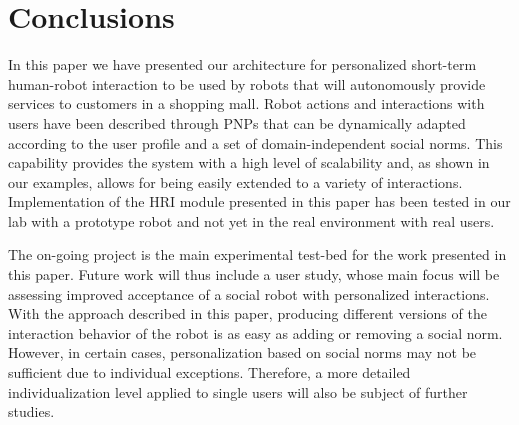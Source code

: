 \vspace{-0.2cm}
\section{Conclusions}
\vspace{-0.1cm}

In this paper we have presented our architecture for personalized short-term human-robot interaction to be used by {\coaches} robots that will autonomously provide services to customers in a shopping mall.
Robot actions and interactions with users have been described through PNPs that can be dynamically adapted according to the user profile and a set of domain-independent social norms. This capability provides the system with a high level of scalability and, as shown in our examples, allows for being easily extended to a variety of interactions.
Implementation of the HRI module presented in this paper has been tested in our lab with a prototype robot and not yet in the real environment with real users.

The on-going {\coaches} project is the main experimental test-bed for the work presented in this paper. Future work  will thus include a user study, whose main focus will be assessing improved acceptance of a social robot with personalized interactions. With the approach described in this paper, producing different versions of the interaction behavior of the robot is as easy as adding or removing a social norm.
However, in certain cases, personalization based on social norms may not be sufficient due to individual exceptions. Therefore, a more detailed individualization level applied to single users will also be subject of further studies.
